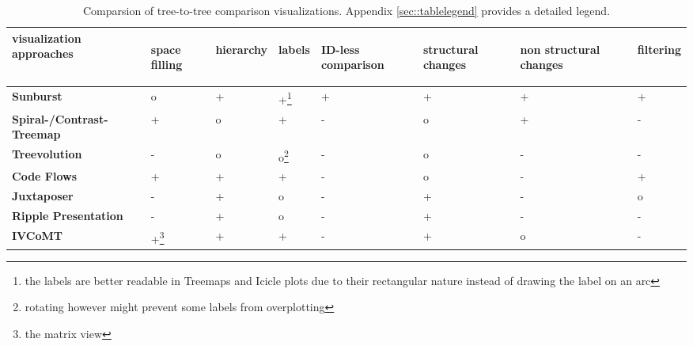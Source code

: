 \begin{table}[tb]
\begin{minipage}{\linewidth}
\centering 
\begin{tabularx}{0.8\textwidth}{|l|>{\centering\arraybackslash}X|>{\centering\arraybackslash}X|>{\centering\arraybackslash}X|>{\centering\arraybackslash}X|>{\centering\arraybackslash}X|>{\centering\arraybackslash}X|>{\centering\arraybackslash}X|} 
\hline
\centering\textbf{visualization approaches} & \begin{sideways}\textbf{space filling}\end{sideways} & \begin{sideways}\textbf{hierarchy}\end{sideways} & \begin{sideways}\textbf{labels}\end{sideways} & \begin{sideways}\textbf{ID-less comparison}\end{sideways} & \begin{sideways}\textbf{structural changes}\end{sideways} & \begin{sideways}\textbf{non structural changes\ }\end{sideways} & \begin{sideways}\textbf{filtering}\end{sideways}\\
\hline
\hline
\textbf{Sunburst} & o & + & +\footnote{the labels are better readable in Treemaps and Icicle plots due to their rectangular nature instead of drawing the label on an arc} & + & + & + & +\\
\hline
\textbf{Spiral-/Contrast-Treemap} & + & o & + & - & o & + & -\\
\hline
\textbf{Treevolution} & - & o & o\footnote{rotating however might prevent some labels from overplotting} & - & o & - & -\\
\hline
\textbf{Code Flows} & + & + & + & - & o & - & +\\
\hline
\textbf{Juxtaposer} & - & + & o & - & + & - & o \\
\hline
\textbf{Ripple Presentation} & - & + & o & - & + & - & -\\
\hline
\textbf{IVCoMT} & +\footnote{the matrix view} & + & + & - & + & o & -\\
\hline
\end{tabularx}
\label{chap5:comparsion}
\vspace{0.5em} 
\caption{Comparsion of tree-to-tree comparison visualizations. Appendix \ref{sec::tablelegend} provides a detailed legend.}
\end{minipage}
\end{table}

